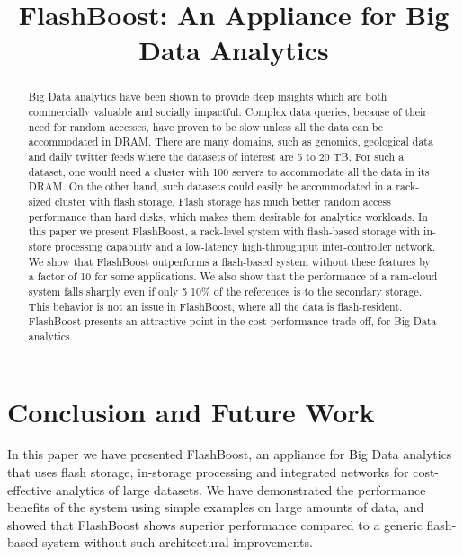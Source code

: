 \documentclass[pageno]{jpaper}
\begin{document}
\title{
FlashBoost: An Appliance for Big Data Analytics
}

\date{}
\maketitle


\begin{abstract}
Big Data analytics have been shown to provide deep insights which are both
commercially valuable and socially impactful. Complex data queries, because of
their need for random accesses, have proven to be slow unless all the data can
be accommodated in DRAM. There are many domains, such as genomics, geological
data and daily twitter feeds where the datasets of interest are 5 to 20 TB. For
such a dataset, one would need a cluster with 100 servers to accommodate all the
data in its DRAM. On the other hand, such datasets could easily be accommodated
in a rack-sized cluster with flash storage. Flash storage has much better random
access performance than hard disks, which makes them desirable for analytics
workloads. In this paper we present FlashBoost, a rack-level system with
flash-based storage with in-store processing capability and a low-latency
high-throughput inter-controller network.  We show that FlashBoost outperforms a
flash-based system without these features by a factor of 10 for some
applications. We also show that the performance of a ram-cloud system falls
sharply even if only 5 10\% of the references is to the secondary storage. This
behavior is not an issue in FlashBoost, where all the data is flash-resident.
FlashBoost presents an attractive point in the cost-performance trade-off, for
Big Data analytics. 
\end{abstract}



%







%

\section{Conclusion and Future Work}

In this paper we have presented FlashBoost, an appliance for Big Data analytics
that uses flash storage, in-storage processing and integrated networks for
cost-effective analytics of large datasets. We have demonstrated the performance
benefits of the system using simple examples on large amounts of data, and showed
that FlashBoost shows superior performance compared to a generic flash-based
system without such architectural improvements.
\end{document}
